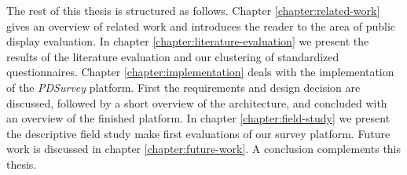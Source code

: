 	The rest of this thesis is structured as follows. Chapter \ref{chapter:related-work} gives an overview of related work and introduces the reader to the area of public display evaluation. In chapter \ref{chapter:literature-evaluation} we present the results of the literature evaluation and our clustering of standardized questionnaires. Chapter \ref{chapter:implementation} deals with the implementation of the \textit{PDSurvey} platform. First the requirements and design decision are discussed, followed by a short overview of the architecture, and concluded with an overview of the finished platform. In chapter \ref{chapter:field-study} we present the descriptive field study make first evaluations of our survey platform. Future work is discussed in chapter \ref{chapter:future-work}. A conclusion complements this thesis.










